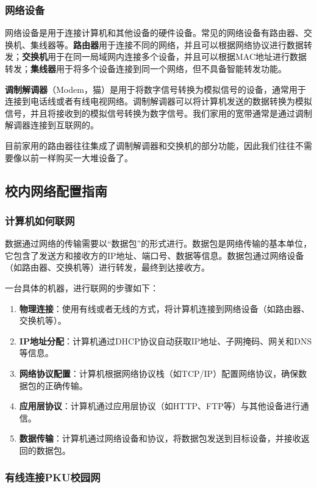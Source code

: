 \documentclass[../main.tex]{subfiles}
\begin{document}
\subsubsection{网络设备}

网络设备是用于连接计算机和其他设备的硬件设备。常见的网络设备有路由器、交换机、集线器等。\textbf{路由器}用于连接不同的网络，并且可以根据网络协议进行数据转发；\textbf{交换机}用于在同一局域网内连接多个设备，并且可以根据MAC地址进行数据转发；\textbf{集线器}用于将多个设备连接到同一个网络，但不具备智能转发功能。

\textbf{调制解调器}（Modem，猫）是用于将数字信号转换为模拟信号的设备，通常用于连接到电话线或者有线电视网络。调制解调器可以将计算机发送的数据转换为模拟信号，并且将接收到的模拟信号转换为数字信号。我们家用的宽带通常是通过调制解调器连接到互联网的。

目前家用的路由器往往集成了调制解调器和交换机的部分功能，因此我们往往不需要像以前一样购买一大堆设备了。

\subsection{校内网络配置指南}

\subsubsection{计算机如何联网}

数据通过网络的传输需要以“数据包”的形式进行。数据包是网络传输的基本单位，它包含了发送方和接收方的IP地址、端口号、数据等信息。数据包通过网络设备（如路由器、交换机等）进行转发，最终到达接收方。

一台具体的机器，进行联网的步骤如下：
\begin{enumerate}
    \item \textbf{物理连接}：使用有线或者无线的方式，将计算机连接到网络设备（如路由器、交换机等）。
    \item \textbf{IP地址分配}：计算机通过DHCP协议自动获取IP地址、子网掩码、网关和DNS等信息。
    \item \textbf{网络协议配置}：计算机根据网络协议栈（如TCP/IP）配置网络协议，确保数据包的正确传输。
    \item \textbf{应用层协议}：计算机通过应用层协议（如HTTP、FTP等）与其他设备进行通信。
    \item \textbf{数据传输}：计算机通过网络设备和协议，将数据包发送到目标设备，并接收返回的数据包。
\end{enumerate}

\subsubsection{有线连接PKU校园网}
\end{document}
